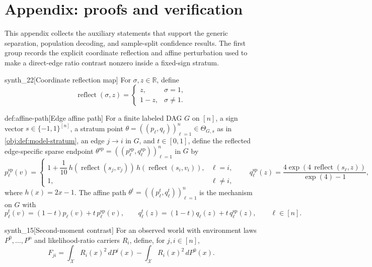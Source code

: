 \section{Appendix: proofs and verification}\label{sec:appendix}

This appendix collects the auxiliary statements that support the generic separation, population decoding, and sample-split confidence results. The first group records the explicit coordinate reflection and affine perturbation used to make a direct-edge ratio contrast nonzero inside a fixed-sign stratum.

\begin{definitionv}{synth_22}[Coordinate reflection map]
For \(\sigma,z\in\mathbb R\), define
\[
\operatorname{reflect}(\sigma,z)
=
\begin{cases}
z, & \sigma=1,\\
1-z, & \sigma\ne 1.
\end{cases}
\]
\end{definitionv}

\begin{definitionv}{def:affine-path}[Edge affine path]
For a finite labeled DAG \(G\) on \([n]\), a sign vector \(s\in\{-1,1\}^{[n]}\), a stratum point \(\theta=((p_\ell,q_\ell))_{\ell=1}^n\in\Theta_{G,s}\) as in \cref{obj:def:model-stratum}, an edge \(j\to i\) in \(G\), and \(t\in[0,1]\), define the reflected edge-specific sparse endpoint \(\theta^{\mathrm{sp}}=((p_\ell^{\mathrm{sp}},q_\ell^{\mathrm{sp}}))_{\ell=1}^n\) in \(G\) by
\[
p_\ell^{\mathrm{sp}}(v)=
\begin{cases}
1+\dfrac{1}{10}\,h(\operatorname{reflect}(s_j,v_j))\,h(\operatorname{reflect}(s_i,v_i)), & \ell=i,\\
1, & \ell\ne i,
\end{cases}
\qquad
q_\ell^{\mathrm{sp}}(z)=
\dfrac{4\exp(4\,\operatorname{reflect}(s_\ell,z))}{\exp(4)-1},
\]
where \(h(x)=2x-1\). The affine path \(\theta^t=((p_\ell^t,q_\ell^t))_{\ell=1}^n\) is the mechanism on \(G\) with
\[
p_\ell^t(v)=(1-t)p_\ell(v)+t\,p_\ell^{\mathrm{sp}}(v),
\qquad
q_\ell^t(z)=(1-t)q_\ell(z)+t\,q_\ell^{\mathrm{sp}}(z),
\qquad \ell\in[n].
\]
\end{definitionv}

\begin{definitionv}{synth_15}[Second-moment contrast]
For an observed world with environment laws \(P^0,\ldots,P^n\) and likelihood-ratio carriers \(R_i\), define, for \(j,i\in[n]\),
\[
F_{ji}
=
\int_{\mathcal X} R_i(x)^2\,dP^j(x)
-
\int_{\mathcal X} R_i(x)^2\,dP^0(x).
\]
\end{definitionv}

